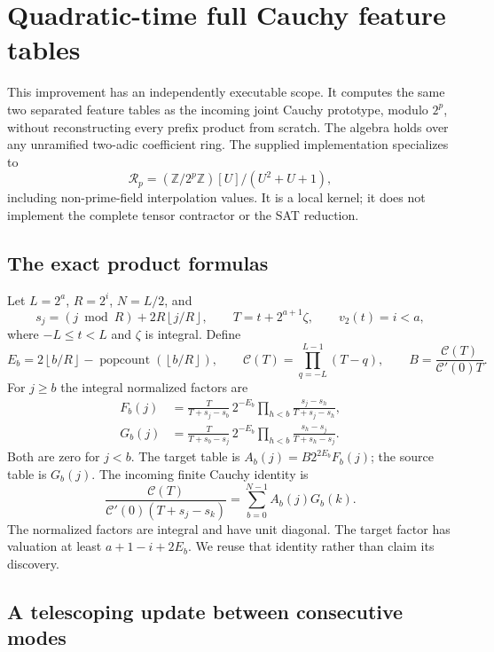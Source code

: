 \documentclass[11pt,letterpaper]{article}
\theoremstyle{definition}\newtheorem{definition}[theorem]{Definition}
\theoremstyle{remark}\newtheorem{remark}[theorem]{Remark}
\newcommand{\vtwo}{v_2}
\newcommand{\pop}{\operatorname{popcount}}
\newcommand{\floor}[1]{\left\lfloor#1\right\rfloor}
\begin{document}
\section{Quadratic-time full Cauchy feature tables}
\label{sec:kernel}

This improvement has an independently executable scope. It computes the
same two separated feature tables as the incoming joint Cauchy prototype,
modulo $2^p$, without reconstructing every prefix product from scratch.
The algebra holds over any unramified two-adic coefficient ring. The
supplied implementation specializes to
\[
 \mathcal R_p=(\mathbb Z/2^p\mathbb Z)[U]/(U^2+U+1),
\]
including non-prime-field interpolation values. It is a local kernel;
it does not implement the complete tensor contractor or the SAT reduction.

\subsection{The exact product formulas}

Let $L=2^a$, $R=2^i$, $N=L/2$, and
\[
 s_j=(j\bmod R)+2R\floor{j/R},\qquad
 T=t+2^{a+1}\zeta,\qquad \vtwo(t)=i<a,
\]
where $-L\le t<L$ and $\zeta$ is integral. Define
\[
 E_b=2\floor{b/R}-\pop(\floor{b/R}),\qquad
 \mathcal C(T)=\prod_{q=-L}^{L-1}(T-q),\qquad
 B=\frac{\mathcal C(T)}{\mathcal C'(0)T}.
\]
For $j\ge b$ the integral normalized factors are
\begin{align}
 F_b(j)&=\frac{T}{T+s_j-s_b}\,2^{-E_b}
            \prod_{h<b}\frac{s_j-s_h}{T+s_j-s_h},\label{eq:F}\\
 G_b(j)&=\frac{T}{T+s_b-s_j}\,2^{-E_b}
            \prod_{h<b}\frac{s_h-s_j}{T+s_h-s_j}.
 \label{eq:G}
\end{align}
Both are zero for $j<b$. The target table is $A_b(j)=B2^{2E_b}F_b(j)$;
the source table is $G_b(j)$. The incoming finite Cauchy identity is
\begin{equation}\label{eq:matrix}
 \frac{\mathcal C(T)}{\mathcal C'(0)(T+s_j-s_k)}
 =\sum_{b=0}^{N-1} A_b(j)G_b(k).
\end{equation}
The normalized factors are integral and have unit diagonal. The target
factor has valuation at least $a+1-i+2E_b$. We reuse that identity rather
than claim its discovery.

\subsection{A telescoping update between consecutive modes}
\end{document}
